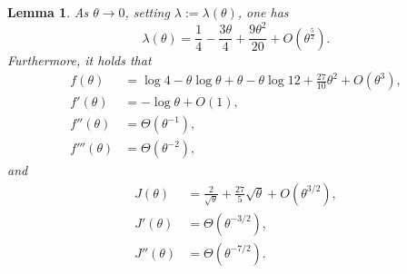 \documentclass[a4paper,12pt]{article}
\newtheorem{lemma}[theorem]{Lemma}
\theoremstyle{definition}
\newcommand{\bigO}[1]{O\left({#1}\right)}
\begin{document}
\begin{lemma}\label{lem_prop_small_theta}
    As $\theta\to 0$, setting $\lambda:=\lambda(\theta)$, one has
\begin{equation}\label{eq_small_theta_lambda}
   \lambda(\theta) = \frac{1}{4}-\frac{3 \theta}{4}+\frac{9 \theta^{2}}{20}+\bigO{\theta^{\frac{5}{2}}}.
\end{equation}
Furthermore, it holds that
\begin{align}
    f(\theta)&=\log4-\theta\log\theta+\theta-\theta\log 12+\frac{27}{10}\theta^2+\bigO{\theta^3},\label{eq_f_as_theta_to_0}\\
    f'(\theta)&=-\log\theta+O(1),\label{eq_fprim_as_theta_to_0}\\
    f''(\theta)&=\Theta(\theta^{-1}),\label{eq_fsec_as_theta_to_0}\\
    f'''(\theta)&=\Theta(\theta^{-2}),\label{eq_fter_as_theta_to_0}
\end{align}
and
\begin{align}
    J(\theta)&=\frac{2}{\sqrt \theta}+\frac{27}{5}\sqrt \theta+\bigO{\theta^{3/2}}\label{eq_J_as_theta_to_0},\\
    J'(\theta)&=\Theta(\theta^{-3/2}),\label{eq_Jprim_as_theta_to_0}\\
    J''(\theta)&=\Theta(\theta^{-7/2}).\label{eq_Jsec_as_theta_to_0}
\end{align}
\end{lemma}
\end{document}
